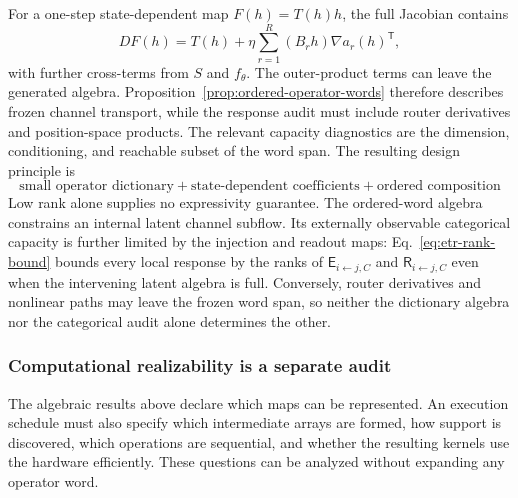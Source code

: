 \documentclass[10pt]{article}
\theoremstyle{definition}
\theoremstyle{remark}
\newcommand{\BookSubsection}[1]{\subsubsection{#1}}
\begin{document}
For a one-step state-dependent map $F(h)=T(h)h$, the full Jacobian contains
\begin{equation}
DF(h)
=T(h)+\eta\sum_{r=1}^{R}(B_rh)\nabla a_r(h)^{\mathsf T},
\label{eq:router-jacobian-escape}
\end{equation}
with further cross-terms from $S$ and $f_\theta$.  The outer-product terms can leave the generated
algebra.  Proposition~\ref{prop:ordered-operator-words} therefore describes frozen channel
transport, while the response audit must include router derivatives and position-space products.
The relevant capacity diagnostics are the dimension, conditioning, and reachable subset of the
word span.  The resulting design principle is
\begin{equation}
\boxed{
\text{small operator dictionary}
+\text{state-dependent coefficients}
+\text{ordered composition}
}
\label{eq:operator-reuse-principle}
\end{equation}
Low rank alone supplies no expressivity guarantee.  The ordered-word algebra constrains an
internal latent channel subflow.  Its externally observable categorical capacity is further
limited by the injection and readout maps: Eq.~\ref{eq:etr-rank-bound} bounds every local response
by the ranks of $\mathsf E_{i\leftarrow j,C}$ and $\mathsf R_{i\leftarrow j,C}$ even when the
intervening latent algebra is full.  Conversely, router derivatives and nonlinear paths may leave
the frozen word span, so neither the dictionary algebra nor the categorical audit alone determines
the other.

\BookSubsection{Computational realizability is a separate audit}

The algebraic results above declare which maps can be represented.  An execution schedule must
also specify which intermediate arrays are formed, how support is discovered, which operations are
sequential, and whether the resulting kernels use the hardware efficiently.  These questions can
be analyzed without expanding any operator word.
\end{document}
